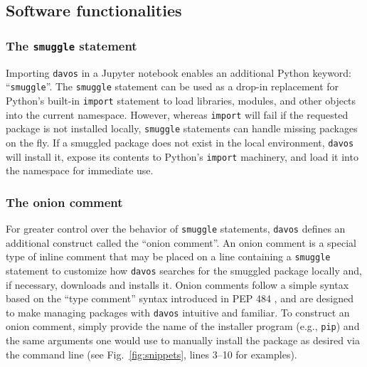 \documentclass[preprint,12pt, a4paper]{elsarticle}
\newcommand{\comment}[1]{}
\begin{document}
\subsection{Software functionalities}

\subsubsection{The \texttt{smuggle} statement}\label{subsec:smuggle}
Importing \texttt{davos} in a Jupyter notebook enables an additional Python keyword: ``\texttt{smuggle}''.
The \texttt{smuggle} statement can be used as a drop-in replacement for Python's built-in \texttt{import} statement to load libraries, modules, and other objects into the current namespace.
However, whereas \texttt{import} will fail if the requested package is not installed locally, \texttt{smuggle} statements can handle missing packages on the fly.
If a smuggled package does not exist in the local environment, \texttt{davos} will install it, expose its contents to Python's \texttt{import} machinery, and load it into the namespace for immediate use.

\subsubsection{The onion comment}\label{subsec:onion}
For greater control over the behavior of \texttt{smuggle} statements, \texttt{davos} defines an additional construct called the ``onion comment''. An onion comment is a special type of inline comment that may be placed on a line containing a \texttt{smuggle} statement to customize how \texttt{davos} searches for the smuggled package locally and, if necessary, downloads and installs it. Onion comments follow a simple syntax based on the ``type comment'' syntax introduced in PEP 484 \cite{vanREtal14}, and are designed to make managing packages with \texttt{davos} intuitive and familiar. To construct an onion comment, simply provide the name of the installer program (e.g., \texttt{pip}) and the same arguments one would use to manually install the package as desired via the command line\comment{(see Fig.~\ref{fig:snippets})} (see Fig.~\ref{fig:snippets}, lines 3--10 for examples).
\end{document}

